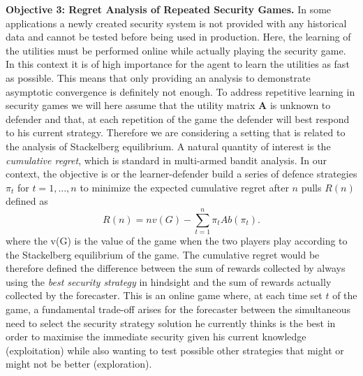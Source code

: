 \textbf{Objective 3: Regret Analysis of Repeated Security Games.}
In some applications a newly created security system is not provided with any historical data and cannot be tested before being used in production. Here, the learning of the utilities must be performed online while actually playing the security game. In this context it is of high importance for the agent to learn the utilities as fast as possible. This means that only providing an analysis to demonstrate asymptotic convergence is definitely not enough. To address repetitive learning in security games we will here assume that the utility matrix $\boldsymbol  A$ is unknown to  defender and that, at each repetition of the game the defender will best respond to his current strategy. Therefore we are considering a setting that is related to the analysis of Stackelberg equilibrium. A natural quantity of interest is the \textit{cumulative regret},  which is standard  in multi-armed bandit analysis. In our context, the objective is or the learner-defender build a series of defence strategies $\pi_t$ for $t=1,\ldots, n$ to minimize the expected cumulative regret after $n$ pulls $R(n)$ defined as
% 
\begin{equation*}
R(n)=nv(G)-\sum_{t=1}^n \pi_t A b(\pi_t).
\end{equation*}
%
where the v(G) is the value of the game when the two players play according to the Stackelberg equilibrium of the game. The cumulative regret would be therefore defined the difference between the sum of rewards collected by always using the \textit{best security strategy} in hindsight and the sum of rewards actually collected by the forecaster.
This is an online game where, at each time set $t$ of the game, a fundamental trade-off arises for the forecaster between the simultaneous need to select the security strategy solution he currently thinks is the best in order to maximise the immediate security given his current knowledge  (exploitation)  while also wanting to test possible other strategies that might or might not be better (exploration).

